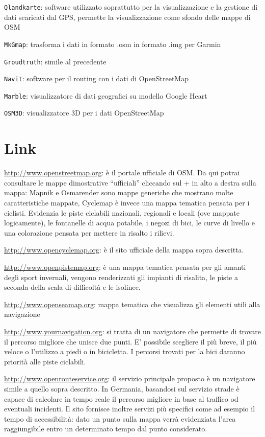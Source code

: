 \documentclass[a4paper,twoside,12pt,]{article}
\newcommand{\osm}{OpenStreetMap\xspace}
\newcommand{\gps}{GPS\xspace}
\begin{document}
\texttt{Qlandkarte}: software utilizzato soprattutto per la visualizzazione e la gestione di dati scaricati dal \gps, permette la visualizzazione come sfondo delle mappe di OSM

\texttt{MkGmap}: trasforma i dati in formato .osm in formato .img per Garmin

\texttt{Groudtruth}: simile al precedente

\texttt{Navit}: software per il routing con i dati di \osm

\texttt{Marble}: visualizzatore di dati geografici su modello Google Heart

\texttt{OSM3D}: visualizzatore 3D per i dati \osm

\section{Link}
\url{http://www.openstreetmap.org}: è il portale ufficiale di OSM. Da qui potrai consultare le mappe dimostrative “ufficiali” cliccando sul + in alto a destra sulla mappa:
Mapnik e Osmarender sono mappe generiche che mostrano molte caratteristiche mappate,
Cyclemap è invece una mappa tematica pensata per i ciclisti. Evidenzia le piste ciclabili nazionali, regionali e locali (ove mappate logicamente), le fontanelle di acqua potabile, i negozi di bici, le curve di livello e una colorazione pensata per mettere in risalto i rilievi.

\url{http://www.opencyclemap.org}: è il sito ufficiale della mappa sopra descritta.

\url{http://www.openpistemap.org}: è una mappa tematica pensata per gli amanti degli sport invernali, vengono renderizzati gli impianti di risalita, le piste a seconda della scala di difficoltà e le isolinee. 


\url{http://www.openseamap.org}: mappa tematica che visualizza gli elementi utili alla navigazione

\url{http://www.yournavigation.org}: si tratta di un navigatore che permette di trovare il percorso migliore che unisce due punti. E' possibile scegliere il più breve, il più veloce o l'utilizzo a piedi o in bicicletta. I percorsi trovati per la bici daranno priorità alle piste ciclabili.

\url{http://www.openrouteservice.org}: il servizio principale proposto è un navigatore simile a quello sopra descritto. In Germania, basandosi sul servizio strade è capace di calcolare in tempo reale il percorso migliore in base al traffico od eventuali incidenti. Il sito fornisce inoltre servizi più specifici come ad esempio il tempo di accessibilità: dato un punto sulla mappa verrà evidenziata l'area raggiungibile entro un determinato tempo dal punto considerato.
\end{document}
